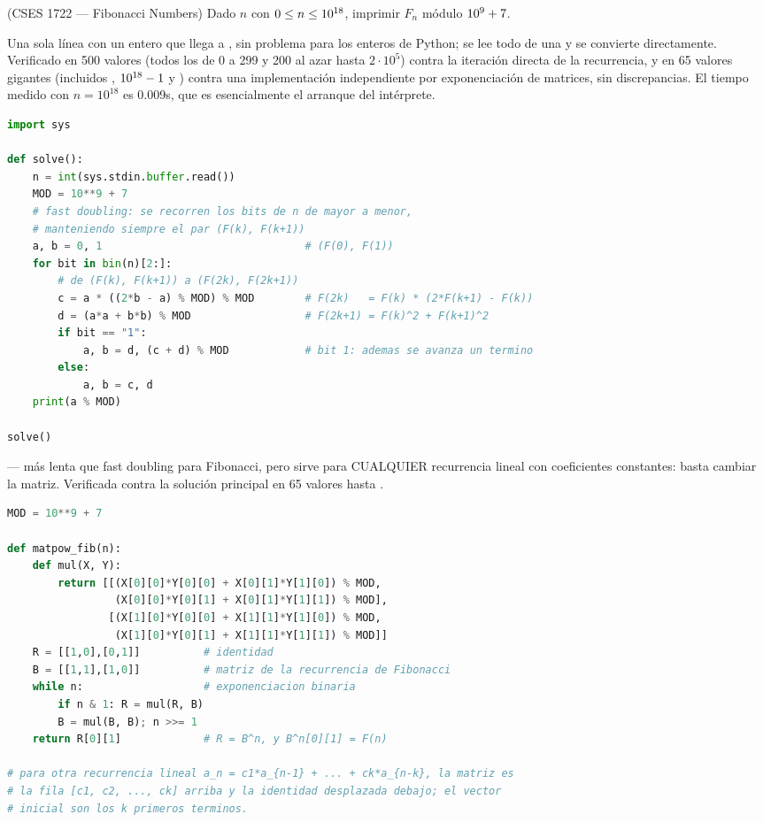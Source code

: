 
(CSES 1722 — Fibonacci Numbers) Dado $n$ con $0 \le n \le 10^{18}$, imprimir $F_n$ módulo $10^{9}+7$.

 Una sola línea con un entero que llega a , sin problema para los enteros de Python; se lee todo de una y se convierte directamente. Verificado en 500 valores (todos los de 0 a 299 y 200 al azar hasta $2\cdot10^5$) contra la iteración directa de la recurrencia, y en 65 valores gigantes (incluidos , $10^{18}-1$ y ) contra una implementación independiente por exponenciación de matrices, sin discrepancias. El tiempo medido con $n = 10^{18}$ es \aprox{}0.009s, que es esencialmente el arranque del intérprete.


\begin{lstlisting}[language=Python]
import sys

def solve():
    n = int(sys.stdin.buffer.read())
    MOD = 10**9 + 7
    # fast doubling: se recorren los bits de n de mayor a menor,
    # manteniendo siempre el par (F(k), F(k+1))
    a, b = 0, 1                                # (F(0), F(1))
    for bit in bin(n)[2:]:
        # de (F(k), F(k+1)) a (F(2k), F(2k+1))
        c = a * ((2*b - a) % MOD) % MOD        # F(2k)   = F(k) * (2*F(k+1) - F(k))
        d = (a*a + b*b) % MOD                  # F(2k+1) = F(k)^2 + F(k+1)^2
        if bit == "1":
            a, b = d, (c + d) % MOD            # bit 1: ademas se avanza un termino
        else:
            a, b = c, d
    print(a % MOD)

solve()
\end{lstlisting}

 — más lenta que fast doubling para Fibonacci, pero sirve para CUALQUIER recurrencia lineal con coeficientes constantes: basta cambiar la matriz. Verificada contra la solución principal en 65 valores hasta .

\begin{lstlisting}[language=Python]
MOD = 10**9 + 7

def matpow_fib(n):
    def mul(X, Y):
        return [[(X[0][0]*Y[0][0] + X[0][1]*Y[1][0]) % MOD,
                 (X[0][0]*Y[0][1] + X[0][1]*Y[1][1]) % MOD],
                [(X[1][0]*Y[0][0] + X[1][1]*Y[1][0]) % MOD,
                 (X[1][0]*Y[0][1] + X[1][1]*Y[1][1]) % MOD]]
    R = [[1,0],[0,1]]          # identidad
    B = [[1,1],[1,0]]          # matriz de la recurrencia de Fibonacci
    while n:                   # exponenciacion binaria
        if n & 1: R = mul(R, B)
        B = mul(B, B); n >>= 1
    return R[0][1]             # R = B^n, y B^n[0][1] = F(n)

# para otra recurrencia lineal a_n = c1*a_{n-1} + ... + ck*a_{n-k}, la matriz es
# la fila [c1, c2, ..., ck] arriba y la identidad desplazada debajo; el vector
# inicial son los k primeros terminos.
\end{lstlisting}
